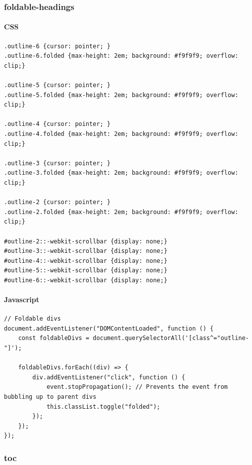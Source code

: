 \documentclass[11pt]{article}
\begin{document}
\subsubsection{foldable-headings}
\label{sec:org1f24ac6}
\paragraph{CSS}
\label{sec:orgad5ce4f}
\begin{verbatim}
.outline-6 {cursor: pointer; }
.outline-6.folded {max-height: 2em; background: #f9f9f9; overflow: clip;}

.outline-5 {cursor: pointer; }
.outline-5.folded {max-height: 2em; background: #f9f9f9; overflow: clip;}

.outline-4 {cursor: pointer; }
.outline-4.folded {max-height: 2em; background: #f9f9f9; overflow: clip;}

.outline-3 {cursor: pointer; }
.outline-3.folded {max-height: 2em; background: #f9f9f9; overflow: clip;}

.outline-2 {cursor: pointer; }
.outline-2.folded {max-height: 2em; background: #f9f9f9; overflow: clip;}

#outline-2::-webkit-scrollbar {display: none;}
#outline-3::-webkit-scrollbar {display: none;}
#outline-4::-webkit-scrollbar {display: none;}
#outline-5::-webkit-scrollbar {display: none;}
#outline-6::-webkit-scrollbar {display: none;}
\end{verbatim}
\paragraph{Javascript}
\label{sec:org5270d03}
\begin{verbatim}
// Foldable divs
document.addEventListener("DOMContentLoaded", function () {
    const foldableDivs = document.querySelectorAll('[class^="outline-"]');

    foldableDivs.forEach((div) => {
        div.addEventListener("click", function () {
            event.stopPropagation(); // Prevents the event from bubbling up to parent divs
            this.classList.toggle("folded");
        });
    });
});
\end{verbatim}
\subsubsection{toc}
\label{sec:orgdfa5af3}
\end{document}
